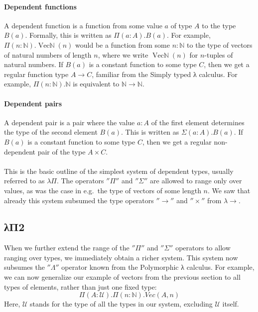 \documentclass[12pt]{article}
\begin{document}
\paragraph{Dependent functions}
A dependent function is a function from some value $a$ of type $A$ to the type $B(a)$. Formally, this is written as $Π(a:A).B(a)$. For example, $Π(n:ℕ).\operatorname{Vecℕ}(n)$ would be a function from some $n:ℕ$ to the type of vectors of natural numbers of length $n$, where we write $\operatorname{Vecℕ}(n)$ for $n$-tuples of natural numbers. If $B(a)$ is a constant function to some type $C$, then we get a regular function type $A → C$, familiar from the Simply typed λ calculus. For example, $Π(n:ℕ).ℕ $ is equivalent to $ℕ → ℕ$.

\paragraph{Dependent pairs}
A dependent pair is a pair where the value $a:A$ of the first element determines the type of the second element $B(a)$. This is written as $Σ(a:A).B(a)$. If $B(a)$ is a constant function to some type $C$, then we get a regular non-dependent pair of the type $A × C$.

\paragraph{}
This is the basic outline of the simplest system of dependent types, usually referred to as $λΠ$. The operators $''Π''$ and $''Σ''$ are allowed to range only over values, as was the case in e.g.~the type of vectors of some length $n$. We saw that already this system subsumed the type operators $''→''$ and $''×''$ from $λ→$.

\subsection{λΠ2}
When we further extend the range of the $''Π''$ and $''Σ''$ operators to allow ranging over types, we immediately obtain a richer system. This system now subsumes the $''Λ''$ operator known from the Polymorphic λ calculus. For example, we can now generalize our example of vectors from the previous section to all types of elements, rather than just one fixed type:
$$ Π(A:\mathcal{U}).Π(n:ℕ).Vec(A, n) $$
Here, $\mathcal{U}$ stands for the type of all the types in our system, excluding $\mathcal{U}$ itself.
\end{document}
